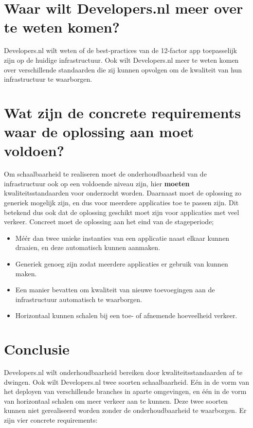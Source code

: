 \section{Waar wilt Developers.nl meer over te weten komen?}

Developers.nl wilt weten of de best-practices van de 12-factor app toepasselijk zijn op de huidige infrastructuur. Ook wilt Developers.nl meer te weten komen over verschillende standaarden die zij kunnen opvolgen om de kwaliteit van hun infrastructuur te waarborgen.

\section{Wat zijn de concrete requirements waar de oplossing aan moet voldoen?}

Om schaalbaarheid te realiseren moet de onderhoudbaarheid van de infrastructuur ook op een voldoende niveau zijn, hier \textbf{moeten} kwaliteitsstandaarden voor onderzocht worden. Daarnaast moet de oplossing zo generiek mogelijk zijn, en dus voor meerdere applicaties toe te passen zijn. Dit betekend dus ook dat de oplossing geschikt moet zijn voor applicaties met veel verkeer. Concreet moet de oplossing aan het eind van de stageperiode;

\begin{itemize}
	\item Méér dan twee unieke instanties van een applicatie naast elkaar kunnen draaien, en deze automatisch kunnen aanmaken.
	\item Generiek genoeg zijn zodat meerdere applicaties er gebruik van kunnen maken.
	\item Een manier bevatten om kwaliteit van nieuwe toevoegingen aan de infrastructuur automatisch te waarborgen.
	\item Horizontaal kunnen schalen bij een toe- of afnemende hoeveelheid verkeer.
\end{itemize}

\section{Conclusie}

Developers.nl wilt onderhoudbaarheid bereiken door kwaliteitsstandaarden af te dwingen. Ook wilt Developers.nl twee soorten schaalbaarheid. Eén in de vorm van het deployen van verschillende branches in aparte omgevingen, en één in de vorm van horizontaal schalen om meer verkeer aan te kunnen. Deze twee soorten kunnen niet gerealiseerd worden zonder de onderhoudbaarheid te waarborgen. Er zijn vier concrete requirements:

